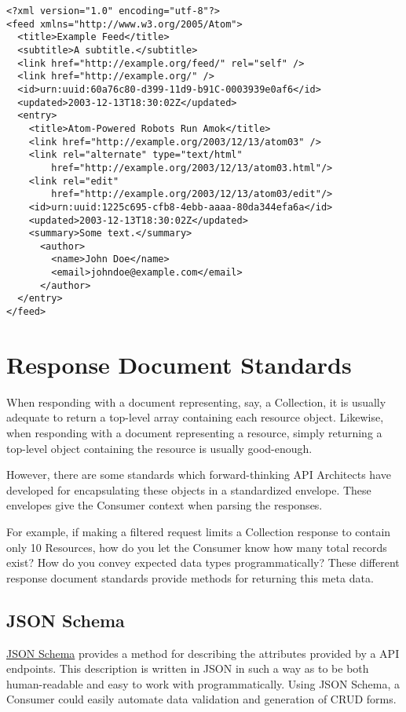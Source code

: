 \begin{verbatim}
<?xml version="1.0" encoding="utf-8"?>
<feed xmlns="http://www.w3.org/2005/Atom">
  <title>Example Feed</title>
  <subtitle>A subtitle.</subtitle>
  <link href="http://example.org/feed/" rel="self" />
  <link href="http://example.org/" />
  <id>urn:uuid:60a76c80-d399-11d9-b91C-0003939e0af6</id>
  <updated>2003-12-13T18:30:02Z</updated>
  <entry>
    <title>Atom-Powered Robots Run Amok</title>
    <link href="http://example.org/2003/12/13/atom03" />
    <link rel="alternate" type="text/html"
        href="http://example.org/2003/12/13/atom03.html"/>
    <link rel="edit"
        href="http://example.org/2003/12/13/atom03/edit"/>
    <id>urn:uuid:1225c695-cfb8-4ebb-aaaa-80da344efa6a</id>
    <updated>2003-12-13T18:30:02Z</updated>
    <summary>Some text.</summary>
      <author>
        <name>John Doe</name>
        <email>johndoe@example.com</email>
      </author>
  </entry>
</feed>
\end{verbatim}


\section{Response Document Standards}

When responding with a document representing, say, a Collection, it is usually adequate to return a top-level array containing each resource object. Likewise, when responding with a document representing a resource, simply returning a top-level object containing the resource is usually good-enough.

However, there are some standards which forward-thinking API Architects have developed for encapsulating these objects in a standardized envelope. These envelopes give the Consumer context when parsing the responses.

For example, if making a filtered request limits a Collection response to contain only 10 Resources, how do you let the Consumer know how many total records exist? How do you convey expected data types programmatically? These different response document standards provide methods for returning this meta data.

\subsection{JSON Schema}

\href{http://json-schema.org/}{JSON Schema} \cite{JSONSCHEMA} provides a method for describing the attributes provided by a API endpoints. This description is written in JSON in such a way as to be both human-readable and easy to work with programmatically. Using JSON Schema, a Consumer could easily automate data validation and generation of CRUD forms.

